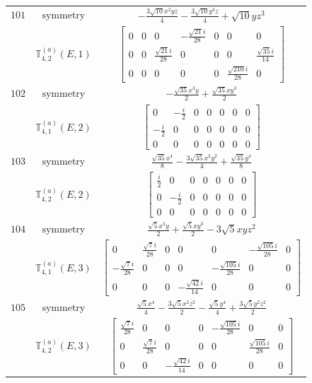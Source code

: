 \documentclass[fleqn,8pt,landscape]{jsarticle}
\begin{document}
\begin{longtable}{ccc}
$ 101 $ & $ \text{symmetry} $ & $ - \frac{3 \sqrt{10} x^{2} y z}{4} - \frac{3 \sqrt{10} y^{3} z}{4} + \sqrt{10} y z^{3} $ \\
$  $ & $ \mathbb{T}_{4,2}^{(a)}(E,1) $ & $ \begin{bmatrix} 0 & 0 & 0 & - \frac{\sqrt{21} i}{28} & 0 & 0 & 0 \\ 0 & 0 & \frac{\sqrt{21} i}{28} & 0 & 0 & 0 & \frac{\sqrt{35} i}{14} \\ 0 & 0 & 0 & 0 & 0 & \frac{\sqrt{210} i}{28} & 0 \end{bmatrix} $ \\ \hline
$ 102 $ & $ \text{symmetry} $ & $ - \frac{\sqrt{35} x^{3} y}{2} + \frac{\sqrt{35} x y^{3}}{2} $ \\
$  $ & $ \mathbb{T}_{4,1}^{(a)}(E,2) $ & $ \begin{bmatrix} 0 & - \frac{i}{2} & 0 & 0 & 0 & 0 & 0 \\ - \frac{i}{2} & 0 & 0 & 0 & 0 & 0 & 0 \\ 0 & 0 & 0 & 0 & 0 & 0 & 0 \end{bmatrix} $ \\ \hline
$ 103 $ & $ \text{symmetry} $ & $ \frac{\sqrt{35} x^{4}}{8} - \frac{3 \sqrt{35} x^{2} y^{2}}{4} + \frac{\sqrt{35} y^{4}}{8} $ \\
$  $ & $ \mathbb{T}_{4,2}^{(a)}(E,2) $ & $ \begin{bmatrix} \frac{i}{2} & 0 & 0 & 0 & 0 & 0 & 0 \\ 0 & - \frac{i}{2} & 0 & 0 & 0 & 0 & 0 \\ 0 & 0 & 0 & 0 & 0 & 0 & 0 \end{bmatrix} $ \\ \hline
$ 104 $ & $ \text{symmetry} $ & $ \frac{\sqrt{5} x^{3} y}{2} + \frac{\sqrt{5} x y^{3}}{2} - 3 \sqrt{5} x y z^{2} $ \\
$  $ & $ \mathbb{T}_{4,1}^{(a)}(E,3) $ & $ \begin{bmatrix} 0 & \frac{\sqrt{7} i}{28} & 0 & 0 & 0 & - \frac{\sqrt{105} i}{28} & 0 \\ - \frac{\sqrt{7} i}{28} & 0 & 0 & 0 & - \frac{\sqrt{105} i}{28} & 0 & 0 \\ 0 & 0 & 0 & - \frac{\sqrt{42} i}{14} & 0 & 0 & 0 \end{bmatrix} $ \\ \hline
$ 105 $ & $ \text{symmetry} $ & $ \frac{\sqrt{5} x^{4}}{4} - \frac{3 \sqrt{5} x^{2} z^{2}}{2} - \frac{\sqrt{5} y^{4}}{4} + \frac{3 \sqrt{5} y^{2} z^{2}}{2} $ \\
$  $ & $ \mathbb{T}_{4,2}^{(a)}(E,3) $ & $ \begin{bmatrix} \frac{\sqrt{7} i}{28} & 0 & 0 & 0 & - \frac{\sqrt{105} i}{28} & 0 & 0 \\ 0 & \frac{\sqrt{7} i}{28} & 0 & 0 & 0 & \frac{\sqrt{105} i}{28} & 0 \\ 0 & 0 & - \frac{\sqrt{42} i}{14} & 0 & 0 & 0 & 0 \end{bmatrix} $ \\ \hline

\end{longtable}
\end{document}
